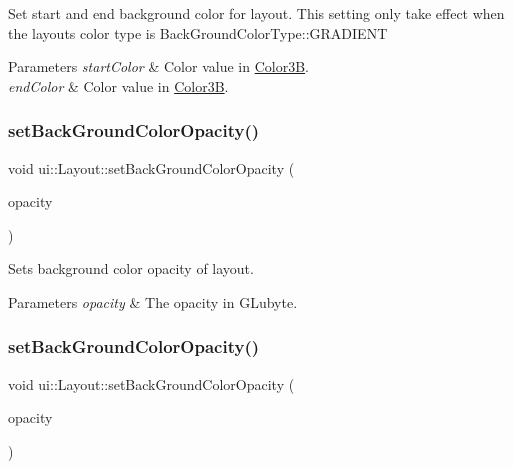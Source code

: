 Set start and end background color for layout. This setting only take effect when the layout\textquotesingle{}s color type is Back\+Ground\+Color\+Type\+::\+G\+R\+A\+D\+I\+E\+NT


\begin{DoxyParams}{Parameters}
{\em start\+Color} & Color value in \hyperlink{structColor3B}{Color3B}. \\
\hline
{\em end\+Color} & Color value in \hyperlink{structColor3B}{Color3B}. \\
\hline
\end{DoxyParams}
\mbox{\label{classui_1_1Layout_a69462211ca370314a9f2f9cda130c38d}} 
\subsubsection{\texorpdfstring{set\+Back\+Ground\+Color\+Opacity()}{setBackGroundColorOpacity()}\hspace{0.1cm}{\footnotesize\ttfamily [1/2]}}
{\footnotesize\ttfamily void ui\+::\+Layout\+::set\+Back\+Ground\+Color\+Opacity (\begin{DoxyParamCaption}\item[{G\+Lubyte}]{opacity }\end{DoxyParamCaption})}

Sets background color opacity of layout.


\begin{DoxyParams}{Parameters}
{\em opacity} & The opacity in {\ttfamily G\+Lubyte}. \\
\hline
\end{DoxyParams}
\mbox{\label{classui_1_1Layout_a69462211ca370314a9f2f9cda130c38d}} 
\subsubsection{\texorpdfstring{set\+Back\+Ground\+Color\+Opacity()}{setBackGroundColorOpacity()}\hspace{0.1cm}{\footnotesize\ttfamily [2/2]}}
{\footnotesize\ttfamily void ui\+::\+Layout\+::set\+Back\+Ground\+Color\+Opacity (\begin{DoxyParamCaption}\item[{G\+Lubyte}]{opacity }\end{DoxyParamCaption})}

